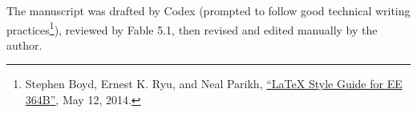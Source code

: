 \documentclass[11pt]{article}
\begin{document}
The manuscript was drafted by Codex (prompted to follow good technical writing practices\footnote{Stephen Boyd, Ernest K. Ryu, and Neal Parikh,
\href{https://web.stanford.edu/class/ee364b/latex_templates/template_notes.pdf}{``\LaTeX{} Style Guide for EE 364B''},
May 12, 2014.}), reviewed by Fable 5.1, then revised and edited manually by the author.



\begingroup
\small
\raggedright

\endgroup
\end{document}
